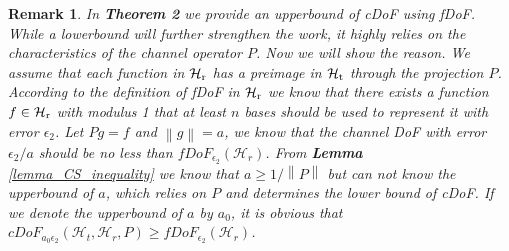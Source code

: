 \documentclass[12pt,draftclsnofoot,journal,onecolumn]{IEEEtran}
\newtheorem{remark}{Remark}
\begin{document}
	{\color{red}
	\begin{remark}
		In {\bf Theorem 2} we provide an upperbound of cDoF using fDoF. While a lowerbound will further strengthen the work, it highly relies on the characteristics of the channel operator $P$. Now we will show the reason. We assume that each function in $\mathcal{H}_{\rm r}$ has a preimage in $\mathcal{H}_{\rm t}$ through the projection $P$. According to the definition of fDoF in $\mathcal{H}_{\rm r}$ we know that there exists a function $f\in \mathcal{H}_{\rm r}$ with modulus 1 that at least $n$ bases should be used to represent it with error $\epsilon_2$. Let $Pg = f$ and $\left\| g\right\| = a$, we know that the channel DoF with error $\epsilon_2/a$ should be no less than $fDoF_{\epsilon_2}(\mathcal{H}_r)$. From {\bf Lemma} \ref{lemma_CS_inequality} we know that $a \geqslant 1/\left\|  P \right\|$ but can not know the upperbound of $a$, which relies on $P$ and determines the lower bound of cDoF. If we denote the upperbound of $a$ by $a_0$, it is obvious that $cDoF_{a_0\epsilon_2}(\mathcal{H}_t,\mathcal{H}_r,P)\geqslant fDoF_{\epsilon_2}(\mathcal{H}_r)$. 
	
	\end{remark}
	}
\end{document}

